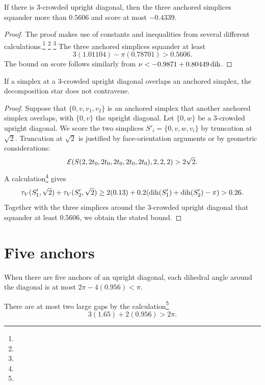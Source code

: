 \begin{lemma}
    \label{lemma:3-crowded}
If there is $3$-crowded upright diagonal, then the three anchored
simplices squander more than $0.5606$ and score at most $-0.4339$.
\end{lemma}


\begin{proof}  The proof makes use of constants and inequalities from
several different calculations.\footnote{} %
\footnote{} %
\footnote{} %
The three anchored simplices squander at
least
    $$
    3 (1.01104) - \pi (0.78701) > 0.5606.
    $$
The bound on score follows similarly from $\nu<-0.9871+0.80449\operatorname{dih}$.
\end{proof}

\begin{lemma}
If a simplex at a $3$-crowded upright diagonal overlaps an
anchored simplex, the decomposition star does not contravene.
\end{lemma}

\begin{proof}
Suppose that $\{0,v,v_1,v_2\}$ is an anchored simplex that another
anchored simplex overlaps, with $\{0,v\}$ the upright diagonal.  Let
$\{0,w\}$ be a $3$-crowded upright diagonal. We score the two
simplices $S'_i = \{0,v,w,v_i\}$ by truncation at $\sqrt{2}$.
Truncation at $\sqrt{2}$ is justified by face-orientation
arguments or by geometric considerations:
    $$
    {\mathcal E}(S(2,2t_0,2t_0,2t_0,2t_0,2t_0),2,2,2)>2\sqrt{2}.
    $$
A calculation\footnote{} %
gives
    $$\tau_V(S'_1,\sqrt{2})+\tau_V(S'_2,\sqrt{2})\ge 2(0.13) +
        0.2(\operatorname{dih}(S'_1)+\operatorname{dih}(S'_2)-\pi) > 0.26.
    $$
Together with the three simplices around the $3$-crowded upright
diagonal that squander at least $0.5606$, we obtain the stated
bound.
\end{proof}



\section{Five anchors}
    \label{sec:five-anchors}


When there are five anchors of an upright diagonal, each dihedral angle
around the diagonal is at most $2\pi-4(0.956)<\pi$.

\begin{remark}\label{rem:2gap}
There are at most
two large gaps by the calculation\footnote{} %
    $$3(1.65)+2(0.956)>2\pi.$$
\end{remark}

